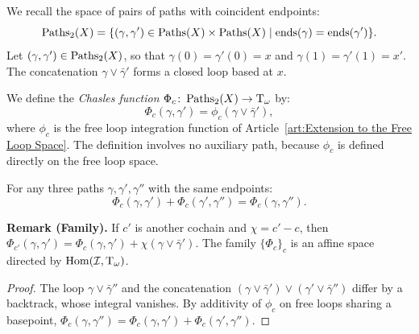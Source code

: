 \documentclass[11pt,reqno,letterpaper,twoside]{amsart}
\begin{document}
  \begin{article}
    \label{art:The Chasles Function}
    
    We recall the space of pairs of paths with coincident endpoints:
    \[
      \operatorname{Paths}_2(X) = \{ (\gamma, \gamma') \in \operatorname{Paths}(X) \times \operatorname{Paths}(X) \mid \operatorname{ends}(\gamma) = \operatorname{ends}(\gamma') \}.
      \]
    Let $(\gamma, \gamma') \in \operatorname{Paths}_2(X)$,
    so that $\gamma(0) = \gamma'(0) = x$ and $\gamma(1) = \gamma'(1) = x'$.
    The concatenation $\gamma \vee \bar\gamma'$ forms a closed loop based at $x$.
    
    We define the \emph{Chasles function} $\Phi_c \colon \operatorname{Paths}_2(X) \to \mathrm{T}_\omega$ by:
    \[
      \Phi_c(\gamma, \gamma') = \phi_c(\gamma \vee \bar\gamma'),
      \]
    where $\phi_c$ is the free loop integration function of Article~\ref{art:Extension to the Free Loop Space}.
    The definition involves no auxiliary path,
    because $\phi_c$ is defined directly on the free loop space.
    
    \begin{proposition}
      For any three paths $\gamma, \gamma', \gamma''$ with the same endpoints:
      \[
        \Phi_c(\gamma, \gamma') + \Phi_c(\gamma', \gamma'') = \Phi_c(\gamma, \gamma'').
        \]
    \end{proposition}
    
    \textbf{Remark (Family).}
    If $c'$ is another cochain and $\chi = c' - c$,
    then $\Phi_{c'}(\gamma, \gamma') = \Phi_c(\gamma, \gamma') + \chi(\gamma \vee \bar\gamma')$.
    The family $\{\Phi_c\}_c$ is an affine space directed by $\mathrm{Hom}(\mathcal{I}, \mathrm{T}_\omega)$.
  \end{article}
  
  \begin{proof}
    The loop $\gamma \vee \bar\gamma''$ and the concatenation $(\gamma \vee \bar\gamma') \vee (\gamma' \vee \bar\gamma'')$ differ by a backtrack,
    whose integral vanishes.
    By additivity of $\phi_c$ on free loops sharing a basepoint,
    $\Phi_c(\gamma, \gamma'') = \Phi_c(\gamma, \gamma') + \Phi_c(\gamma', \gamma'')$.
  \end{proof}
  
  
\end{document}
